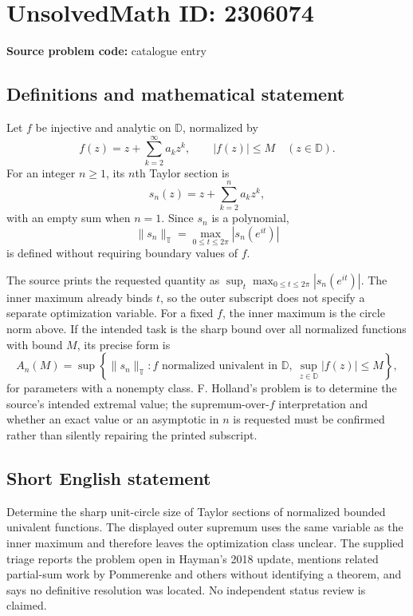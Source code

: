 \documentclass[11pt]{article}
\begin{document}
\section*{UnsolvedMath ID: 2306074}
\textbf{Source problem code:} catalogue entry
\subsection{Definitions and mathematical statement}
Let $f$ be injective and analytic on $\mathbb D$, normalized by
\[
 f(z)=z+\sum_{k=2}^{\infty}a_kz^k,
 \qquad |f(z)|\leq M\quad(z\in\mathbb D).
\]
For an integer $n\geq1$, its $n$th Taylor section is
\[
 s_n(z)=z+\sum_{k=2}^{n}a_kz^k,
\]
with an empty sum when $n=1$. Since $s_n$ is a polynomial,
\[
 \|s_n\|_{\mathbb T}=\max_{0\leq t\leq2\pi}|s_n(e^{it})|
\]
is defined without requiring boundary values of $f$.

The source prints the requested quantity as $\sup_t\max_{0\leq t\leq2\pi}|s_n(e^{it})|$. The inner maximum already binds $t$, so the outer subscript does not specify a separate optimization variable. For a fixed $f$, the inner maximum is the circle norm above. If the intended task is the sharp bound over all normalized functions with bound $M$, its precise form is
\[
 A_n(M)=\sup\left\{\|s_n\|_{\mathbb T}:
 f\text{ normalized univalent in }\mathbb D,
 \ \sup_{z\in\mathbb D}|f(z)|\leq M\right\},
\]
for parameters with a nonempty class. F. Holland's problem is to determine the source's intended extremal value; the supremum-over-$f$ interpretation and whether an exact value or an asymptotic in $n$ is requested must be confirmed rather than silently repairing the printed subscript.
\subsection{Short English statement}
Determine the sharp unit-circle size of Taylor sections of normalized bounded univalent functions. The displayed outer supremum uses the same variable as the inner maximum and therefore leaves the optimization class unclear. The supplied triage reports the problem open in Hayman's 2018 update, mentions related partial-sum work by Pommerenke and others without identifying a theorem, and says no definitive resolution was located. No independent status review is claimed.
\end{document}
